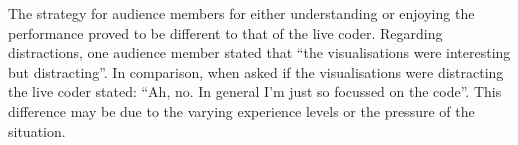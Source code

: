 The strategy for audience members for either understanding or enjoying the performance proved to be different to that of the live coder. Regarding distractions, one audience member stated that ``the visualisations were interesting but distracting''. In comparison, when asked if the visualisations were distracting the live coder stated: ``Ah, no. In general I'm just so focussed on the code''. This difference may be due to the varying experience levels or the pressure of the situation.\\














